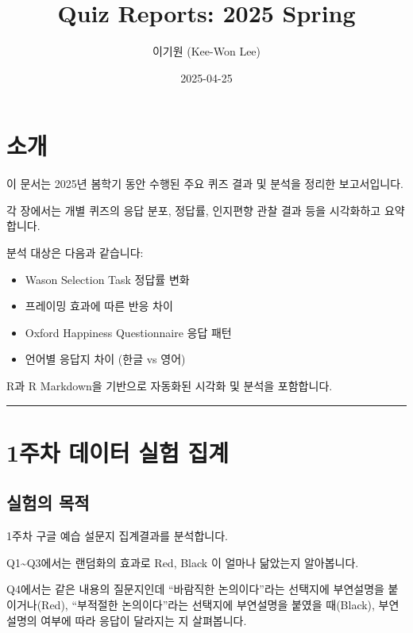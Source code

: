 \documentclass[
]{book}
\title{Quiz Reports: 2025 Spring}
\author{이기원 (Kee-Won Lee)}
\date{2025-04-25}
\providecommand{\tightlist}{%
  \setlength{\itemsep}{0pt}\setlength{\parskip}{0pt}}
\begin{document}
\maketitle

{
\setcounter{tocdepth}{1}
\tableofcontents
}
\chapter*{소개}\label{uxc18cuxac1c}

이 문서는 2025년 봄학기 동안 수행된 주요 퀴즈 결과 및 분석을 정리한 보고서입니다.

각 장에서는 개별 퀴즈의 응답 분포, 정답률, 인지편향 관찰 결과 등을 시각화하고 요약합니다.

분석 대상은 다음과 같습니다:

\begin{itemize}
\tightlist
\item
  Wason Selection Task 정답률 변화
\item
  프레이밍 효과에 따른 반응 차이
\item
  Oxford Happiness Questionnaire 응답 패턴
\item
  언어별 응답지 차이 (한글 vs 영어)
\end{itemize}

R과 R Markdown을 기반으로 자동화된 시각화 및 분석을 포함합니다.

\begin{center}\rule{0.5\linewidth}{0.5pt}\end{center}

\chapter{1주차 데이터 실험 집계}\label{uxc8fcuxcc28-uxb370uxc774uxd130-uxc2e4uxd5d8-uxc9d1uxacc4}

\section{실험의 목적}\label{uxc2e4uxd5d8uxc758-uxbaa9uxc801}

1주차 구글 예습 설문지 집계결과를 분석합니다.

Q1\textasciitilde Q3에서는 랜덤화의 효과로 Red, Black 이 얼마나 닮았는지 알아봅니다.

Q4에서는 같은 내용의 질문지인데 ``바람직한 논의이다''라는 선택지에 부연설명을 붙이거나(Red), ``부적절한 논의이다''라는 선택지에 부연설명을 붙였을 때(Black), 부연설명의 여부에 따라 응답이 달라지는 지 살펴봅니다.
\end{document}
